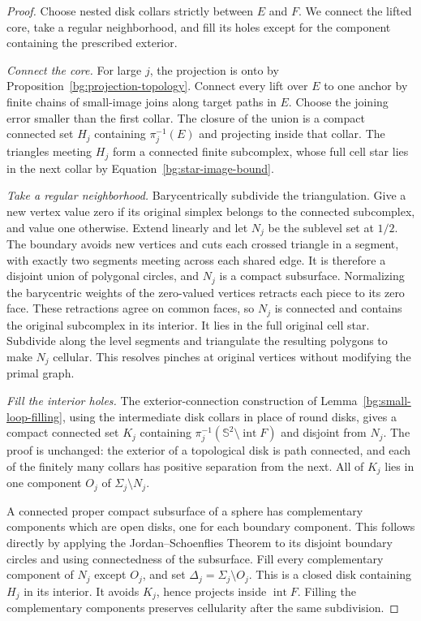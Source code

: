 \begin{proof}
Choose nested disk collars strictly between $E$ and $F$. We connect
the lifted core, take a regular neighborhood, and fill its holes
except for the component containing the prescribed exterior.

\emph{Connect the core.} For large $j$, the projection is onto by
Proposition~\ref{bg:projection-topology}. Connect every lift over $E$
to one anchor by finite chains of small-image joins along target
paths in $E$. Choose the joining error smaller than the first collar.
The closure of the union is a compact connected set $H_j$ containing
$\pi_j^{-1}(E)$ and projecting inside that collar. The triangles
meeting $H_j$ form a connected finite subcomplex, whose full cell
star lies in the next collar by Equation~\ref{bg:star-image-bound}.

\emph{Take a regular neighborhood.} Barycentrically subdivide the
triangulation. Give a new vertex value zero if its original simplex
belongs to the connected subcomplex, and value one otherwise.
Extend linearly and let $N_j$ be the sublevel set at $1/2$.
The boundary avoids new vertices and cuts each crossed triangle in
a segment, with exactly two segments meeting across each shared edge.
It is therefore a disjoint union of polygonal circles, and $N_j$ is
a compact subsurface. Normalizing the barycentric weights of the
zero-valued vertices retracts each piece to its zero face. These
retractions agree on common faces, so $N_j$ is connected and contains
the original subcomplex in its interior. It lies in the full original
cell star. Subdivide along the level segments and triangulate the
resulting polygons to make $N_j$ cellular. This resolves pinches at
original vertices without modifying the primal graph.

\emph{Fill the interior holes.} The exterior-connection construction
of Lemma~\ref{bg:small-loop-filling}, using the intermediate disk
collars in place of round disks, gives a compact connected set $K_j$
containing
$\pi_j^{-1}(\mathbb S^2\setminus\operatorname{int}F)$ and disjoint
from $N_j$. The proof is unchanged: the exterior of a topological
disk is path connected, and each of the finitely many collars has
positive separation from the next. All of $K_j$ lies in one component
$O_j$ of $\Sigma_j\setminus N_j$.

A connected proper compact subsurface of a sphere has complementary
components which are open disks, one for each boundary component.
This follows directly by applying the Jordan--Schoenflies Theorem to
its disjoint boundary circles and using connectedness of the
subsurface. Fill every complementary component of $N_j$ except
$O_j$, and set $\Delta_j=\Sigma_j\setminus O_j$. This is a closed
disk containing $H_j$ in its interior. It avoids $K_j$, hence projects
inside $\operatorname{int}F$. Filling the complementary components
preserves cellularity after the same subdivision.
\end{proof}

